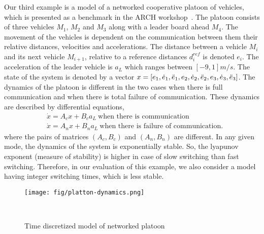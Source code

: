 Our third example is a model of a networked cooperative platoon of
vehicles, which is presented as a benchmark in the ARCH
workshop~\cite{makhlouf2014networked}.  The platoon consists of three
vehicles $M_1$, $M_2$ and $M_3$ along with a leader board ahead $M_4$.
The movement of the vehicles is dependent on the communication between
them their relative distances, velocities and accelerations.  The
distance between a vehicle $M_i$ and its next
vehicle $M_{i+1}$, relative to a reference distances $d_i^{ref}$ is
denoted $e_i$.  The acceleration of the leader vehicle is $a_L$ which
ranges between $[-9,1]m/s$.  The state of the system is denoted
by a vector
$x=\left[e_1,\dot{e}_1,\ddot{e}_1,e_2,\dot{e}_2,\ddot{e}_2,e_3,\dot{e}_3,\ddot{e}_3\right]$.
The dynamics of the platoon is different in the two cases when there
is full communication and when there is total failure of
communication.  These dynamics are described by differential equations,
%
\begin{align*}
& \dot{x}=A_cx+B_ca_L~\text{when there is communication}\\
& \dot{x}=A_nx+B_na_L~\text{when there is failure of communication}.
\end{align*}
%
where the pairs of matrices $(A_c,B_c)$ and $(A_n,B_n)$ are different.
In any given mode, the
dynamics of the system is exponentially stable.  So, the lyapunov
exponent (measure of stability) is higher in case of slow switching
than fast switching.  Therefore, in our evaluation of this example, we
also consider a model having integer switching times, which is less
stable.
%
\begin{figure}
\center
\texttt{[image: fig/platton-dynamics.png]}
\caption{Time discretized model of networked platoon}~\label{fig:model-platoon}
\end{figure}
%
%
